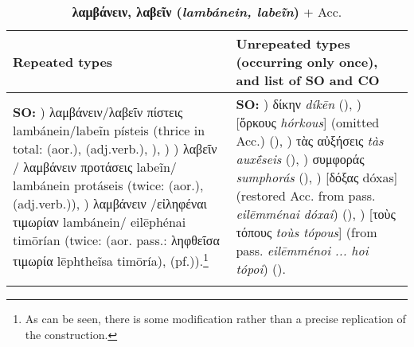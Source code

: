 \documentclass[output=paper,colorlinks,citecolor=brown]{langscibook}
\begin{document}
\begin{table}
\caption{\textbf{λαμβάνειν, λαβεῖν (\textit{lambánein, labeĩn})} + Acc. }
\footnotesize
\begin{tabularx}{\textwidth}{QQ}
        \lsptoprule
        Repeated types%
        & Unrepeated types (occurring only once), and list of SO and CO     \\
        \midrule
\textbf{SO:}
) λαμβάνειν/λαβεῖν πίστεις lambánein/labeĩn písteis (thrice in total:  (aor.),  (adj.verb.), ),
) ) λαβεῖν / λαμβάνειν προτάσεις labeĩn/ lambánein protáseis (twice:  (aor.),  (adj.verb.)),
) λαμβάνειν /εἰληφέναι τιμωρίαν lambánein/ eilēphénai timōrían (twice:  (aor. pass.: ληφθεῖσα τιμωρία lēphtheĩsa timōría),  (pf.)).\footnote{As can be seen, there is some modification rather than a precise replication of the construction.} \newline
&
\textbf{SO:}
) δίκην \textit{díkēn} (),
) [ὅρκους \textit{hórkous}] (omitted Acc.) (),
) τὰς αὐξήσεις \textit{tàs auxḗseis} (),
) συμφοράς \textit{sumphorás} (),
) [δόξας dóxas] (restored Acc. from pass. \textit{eilēmménai dóxai}) (),
) [τοὺς τόπους \textit{toùs tópous}] (from pass. \textit{eilēmménoi ... hoi tópoi}) ().\\
\lspbottomrule
\end{tabularx}
\end{table}
\end{document}
